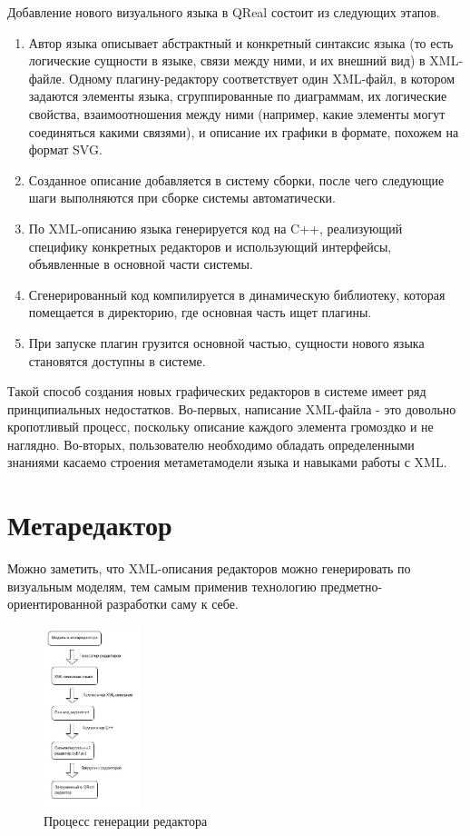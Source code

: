 \documentclass[a4paper]{article}
\begin{document}
Добавление нового визуального языка в QReal состоит из следующих этапов.
\begin{enumerate}
  \item Автор языка описывает абстрактный и конкретный синтаксис языка (то есть логические сущности в языке, связи между ними, и их внешний вид) в XML-файле. Одному плагину-редактору соответствует один XML-файл, в котором задаются элементы языка, сгруппированные по диаграммам, их логические свойства, взаимоотношения между ними (например, какие элементы могут соединяться какими связями), и описание их графики в формате, похожем на формат SVG. 
  \item Созданное описание добавляется в систему сборки, после чего следующие шаги выполняются при сборке системы автоматически.
  \item По XML-описанию языка генерируется код на C++, реализующий специфику конкретных редакторов и использующий интерфейсы, объявленные в основной части системы.
  \item Сгенерированный код компилируется в динамическую библиотеку, которая помещается в директорию, где основная часть ищет плагины.
  \item При запуске плагин грузится основной частью, сущности нового языка становятся доступны в системе.
\end{enumerate}

Такой способ создания новых графических редакторов в системе имеет ряд принципиальных недостатков. Во-первых, написание XML-файла - это довольно кропотливый процесс, поскольку описание каждого элемента громоздко и не наглядно. Во-вторых, пользователю необходимо обладать определенными знаниями касаемо строения метаметамодели языка и навыками работы с XML.

\section{Метаредактор}
Можно заметить, что XML-описания редакторов можно генерировать по визуальным моделям, тем самым применив технологию предметно-ориентированной разработки саму к себе.

\begin{figure}
  \begin{center}
    \includegraphics[width=0.25\textwidth]{editorGeneration.jpg}
    \caption{Процесс генерации редактора}
    \label{editorGeneration}
  \end{center}
\end{figure}
\end{document}
